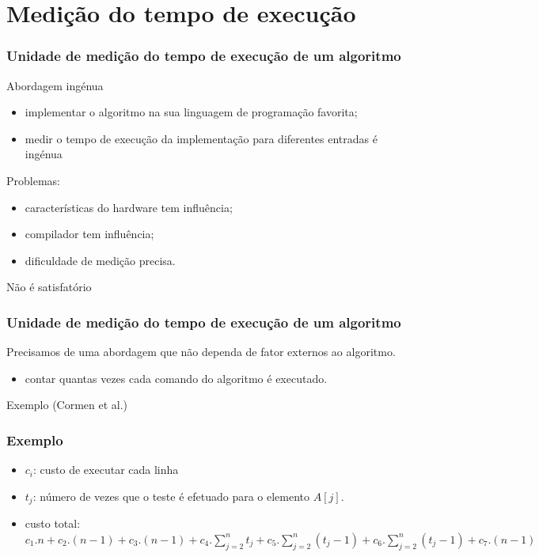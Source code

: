 \documentclass{beamer}
\begin{document}
\section{Medição do tempo de execução}

\begin{frame}
  \frametitle{Unidade de medição do tempo de execução de um algoritmo}
    
  \begin{block}{Abordagem ingénua}
    \begin{itemize}
      \item implementar o algoritmo na sua linguagem de programação favorita;
      \item medir o tempo de execução da implementação para diferentes entradas é ingénua
      \end{itemize}
      Problemas:
      \begin{itemize}
      \item características do hardware tem influência;
      \item compilador tem influência;
      \item dificuldade de medição precisa.
      \end{itemize}
      \alert{Não é satisfatório}
    \end{block}
    
\end{frame}
\begin{frame}
  \frametitle{Unidade de medição do tempo de execução de um algoritmo}
    
  Precisamos de uma abordagem que não dependa de fator externos ao algoritmo.

  \begin{itemize}
  \item contar quantas vezes cada comando do algoritmo é executado.
  \end{itemize}

  Exemplo (Cormen et al.)
\end{frame}

\begin{frame}
  \frametitle{Exemplo}

  

  \begin{itemize}
  \item $c_i$: custo de executar cada linha
  \item $t_j$: número de vezes que o teste é efetuado para o elemento $A[j]$.
  \item custo total: $c_1.n+c_2.(n-1)+c_3.(n-1)+c_4.\sum_{j=2}^{n} t_j + c_5.\sum_{j=2}^{n} (t_j-1) + c_6.\sum_{j=2}^{n} (t_j-1)+c_7.(n-1)$
  \end{itemize}
\end{frame}
\end{document}

